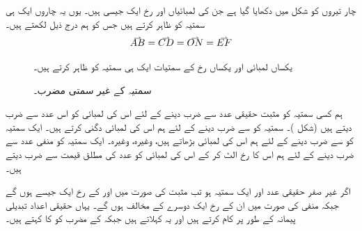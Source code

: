 چار تیروں کو شکل  میں دکھایا گیا ہے جن کی لمبائیاں اور رخ ایک جیسی ہیں۔ یوں یہ چاروں ایک ہی سمتیہ کو ظاہر کرتے ہیں جس کو ہم درج ذیل لکھتے ہیں۔
\begin{align*}
\krightharpoonup{AB}=\krightharpoonup{CD}=\krightharpoonup{ON}=\krightharpoonup{EF}
\end{align*}
\begin{figure}
\centering
\begin{minipage}{0.45\textwidth}
\centering
{}
\caption{یکساں لمبائی اور یکساں رخ کے سمتیات ایک ہی سمتیہ کو ظاہر کرتے ہیں۔}
\label{شکل_مثال_سمتیہ_یکساں_چار}
\end{minipage}\hfill
\begin{minipage}{0.45\textwidth}
\centering
{}
\caption{سمتیہ کے غیر سمتی مضرب۔}
\label{شکل_سمتیہ_غیر_سمتی_مضرب}
\end{minipage}
\end{figure}
ہم کسی سمتیہ کو مثبت حقیقی عدد سے ضرب دینے کے لئے اس کی لمبائی کو اس عدد سے ضرب دیتے ہیں (شکل )۔ سمتیہ کو  سے ضرب دینے کے لئے ہم اس کی لمبائی دگنی کرتے ہیں۔ ایک سمتیہ کو  سے ضرب دینے کے لئے ہم اس کی لمبائی  بڑھاتے ہیں، وغیرہ، وغیرہ۔ ایک سمتیہ کو منفی  عدد سے ضرب دینے کے لئے ہم اس کا رخ الٹ کر کے اس کی لمبائی کو عدد کی مطلق قیمت سے ضرب دیتے ہیں۔

اگر  غیر صفر حقیقی عدد اور  ایک سمتیہ ہو تب مثبت  کی صورت میں  اور  کے رخ ایک جیسے ہوں گے جبکہ منفی  کی صورت میں ان کے رخ ایک دوسرے کے مخالف ہوں گے۔ یہاں حقیقی اعداد تبدیلی پیمانہ کے طور پر کام کرتے ہیں اور یہ   کہلاتے ہیں جبکہ  کے مضرب کو  کا  کہتے ہیں۔


